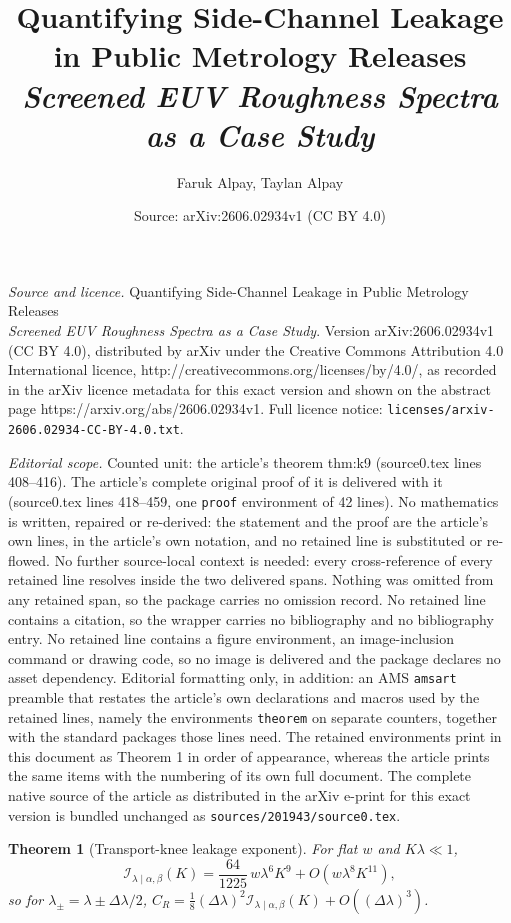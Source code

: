 \documentclass[10pt,a4paper]{amsart}
\title{Quantifying Side-Channel Leakage in Public Metrology Releases\\[1.5ex]{\large\itshape Screened EUV Roughness Spectra as a Case Study}}
\author{Faruk Alpay, Taylan Alpay}
\date{Source: arXiv:2606.02934v1 (CC BY 4.0)}
\newtheorem{theorem}{Theorem}
\newcommand{\calI}{\mathcal I}
\begin{document}
\maketitle

\noindent\emph{Source and licence.} Quantifying Side-Channel Leakage in Public Metrology Releases\\[1.5ex]{\large\itshape Screened EUV Roughness Spectra as a Case Study}. Version arXiv:2606.02934v1 (CC BY 4.0), distributed by arXiv under the Creative Commons Attribution 4.0 International licence, http://creativecommons.org/licenses/by/4.0/, as recorded in the arXiv licence metadata for this exact version and shown on the abstract page https://arxiv.org/abs/2606.02934v1. Full licence notice: \texttt{licenses/arxiv-2606.02934-CC-BY-4.0.txt}.\par\smallskip

\noindent\textit{Editorial scope.} Counted unit: the article's theorem thm:k9 (source0.tex lines 408--416). The article's complete original proof of it is delivered with it (source0.tex lines 418--459, one \texttt{proof} environment of 42 lines). No mathematics is written, repaired or re-derived: the statement and the proof are the article's own lines, in the article's own notation, and no retained line is substituted or re-flowed.  No further source-local context is needed: every cross-reference of every retained line resolves inside the two delivered spans.  Nothing was omitted from any retained span, so the package carries no omission record.  No retained line contains a citation, so the wrapper carries no bibliography and no bibliography entry.  No retained line contains a figure environment, an image-inclusion command or drawing code, so no image is delivered and the package declares no asset dependency.  Editorial formatting only, in addition: an AMS \texttt{amsart} preamble that restates the article's own declarations and macros used by the retained lines, namely the environments \texttt{theorem} on separate counters, together with the standard packages those lines need.  The retained environments print in this document as Theorem 1 in order of appearance, whereas the article prints the same items with the numbering of its own full document.  The complete native source of the article as distributed in the arXiv e-print for this exact version is bundled unchanged as \texttt{sources/201943/source0.tex}.
\begin{theorem}[Transport-knee leakage exponent]
\label{thm:k9}
For flat \(w\) and \(K\lambda\ll1\),
\begin{equation}
\calI_{\lambda\mid\alpha,\beta}(K)=\frac{64}{1225}\,w\lambda^6K^9+O(w\lambda^8K^{11}),
\label{eq:k9}
\end{equation}
so for \(\lambda_\pm=\lambda\pm\Delta\lambda/2\), \(C_R=\tfrac18(\Delta\lambda)^2\calI_{\lambda\mid\alpha,\beta}(K)+O((\Delta\lambda)^3)\).
\end{theorem}
\end{document}
